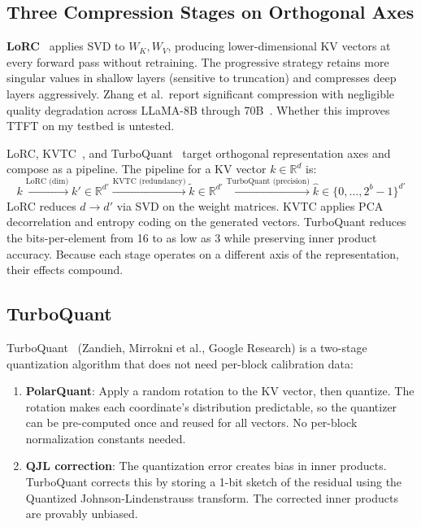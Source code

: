 \documentclass[11pt]{article}
\begin{document}
\subsection{Three Compression Stages on Orthogonal Axes}

\textbf{LoRC}~\cite{zhang2024lorc} applies SVD to $W_K, W_V$, producing lower-dimensional KV vectors at every forward pass without retraining. The progressive strategy retains more singular values in shallow layers (sensitive to truncation) and compresses deep layers aggressively. Zhang et al.\ report significant compression with negligible quality degradation across LLaMA-8B through 70B~\cite{zhang2024lorc}. Whether this improves TTFT on my testbed is untested.

LoRC, KVTC~\cite{kvtc2024}, and TurboQuant~\cite{turboquant2026} target orthogonal representation axes and compose as a pipeline. The pipeline for a KV vector $k \in \mathbb{R}^d$ is:
\[
k \xrightarrow{\text{LoRC (dim)}} k' \in \mathbb{R}^{d'} \xrightarrow{\text{KVTC (redundancy)}} \tilde{k} \in \mathbb{R}^{d'} \xrightarrow{\text{TurboQuant (precision)}} \hat{k} \in \{0,\ldots,2^b-1\}^{d'}
\]
LoRC reduces $d \to d'$ via SVD on the weight matrices. KVTC applies PCA decorrelation and entropy coding on the generated vectors. TurboQuant reduces the bits-per-element from 16 to as low as 3 while preserving inner product accuracy. Because each stage operates on a different axis of the representation, their effects compound.

\subsection{TurboQuant}

TurboQuant~\cite{turboquant2026} (Zandieh, Mirrokni et al., Google Research) is a two-stage quantization algorithm that does not need per-block calibration data:

\begin{enumerate}
\item \textbf{PolarQuant}: Apply a random rotation to the KV vector, then quantize. The rotation makes each coordinate's distribution predictable, so the quantizer can be pre-computed once and reused for all vectors. No per-block normalization constants needed.
\item \textbf{QJL correction}: The quantization error creates bias in inner products. TurboQuant corrects this by storing a 1-bit sketch of the residual using the Quantized Johnson-Lindenstrauss transform. The corrected inner products are provably unbiased.
\end{enumerate}
\end{document}
